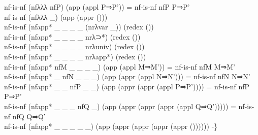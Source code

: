 {\begin{code}
{\>nf-is-nf (nfλλλ nfP) (app (appl P⇒P')) = nf-is-nf nfP P⇒P'\<\\
\>nf-is-nf (nfλλλ \_) (app (appr ()))\<\\
\>nf-is-nf (nfapp* \_ \_ \_ \_ (nrλvar \_)) (redex ())\<\\
\>nf-is-nf (nfapp* \_ \_ \_ \_ nrλ⊃*) (redex ())\<\\
\>nf-is-nf (nfapp* \_ \_ \_ \_ nrλuniv) (redex ())\<\\
\>nf-is-nf (nfapp* \_ \_ \_ \_ nrλapp*) (redex ())\<\\
\>nf-is-nf (nfapp* nfM \_ \_ \_ \_) (app (appl M⇒M')) = nf-is-nf nfM M⇒M'\<\\
\>nf-is-nf (nfapp* \_ nfN \_ \_ \_) (app (appr (appl N⇒N'))) = nf-is-nf nfN N⇒N'\<\\
\>nf-is-nf (nfapp* \_ \_ nfP \_ \_) (app (appr (appr (appl P⇒P')))) = nf-is-nf nfP P⇒P'\<\\
\>nf-is-nf (nfapp* \_ \_ \_ nfQ \_) (app (appr (appr (appr (appl Q⇒Q'))))) = nf-is-nf nfQ Q⇒Q'\<\\
\>nf-is-nf (nfapp* \_ \_ \_ \_ \_) (app (appr (appr (appr (appr ()))))) -\}}\<%
\\
%
\\
\> \AgdaSymbol{:}  \AgdaSymbol{\{}\AgdaSymbol{\}} \AgdaSymbol{\{}\AgdaSymbol{\}} \AgdaSymbol{\{} \AgdaSymbol{:}  \AgdaSymbol{(}  \AgdaSymbol{(} \AgdaSymbol{))\}} \AgdaSymbol{\{}  \AgdaSymbol{:}   \AgdaSymbol{\}} \AgdaSymbol{\{}\AgdaSymbol{\}}           \<%
\\
\> \AgdaSymbol{(}  \AgdaSymbol{\_)} \AgdaSymbol{(} \AgdaSymbol{)} \AgdaSymbol{=}   \<%
\\
\> \AgdaSymbol{(} \AgdaSymbol{\_} \AgdaSymbol{)} \AgdaSymbol{(} \AgdaSymbol{(} \AgdaSymbol{))} \AgdaSymbol{=}   \<%

\end{code}}
